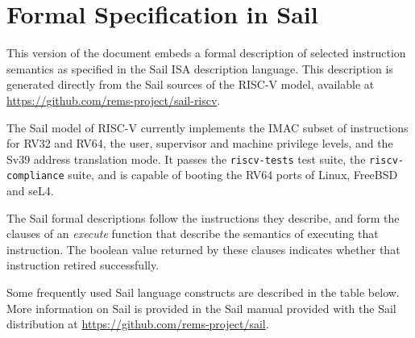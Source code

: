 \section{Formal Specification in Sail}
\label{sect:user-sail-model}

This version of the document embeds a formal description of selected
instruction semantics as specified in the Sail ISA description
language\cite{sail-site}.  This description is generated directly from
the Sail sources of the RISC-V model, available at
\url{https://github.com/rems-project/sail-riscv}.

The Sail model of RISC-V currently implements the IMAC subset of
instructions for RV32 and RV64, the user, supervisor and machine
privilege levels, and the Sv39 address translation mode.  It passes
the \texttt{riscv-tests} test suite, the \texttt{riscv-compliance}
suite, and is capable of booting the RV64 ports of Linux, FreeBSD and
seL4.

The Sail formal descriptions follow the instructions they describe, and
form the clauses of an \textit{execute} function that describe the
semantics of executing that instruction.  The boolean value returned
by these clauses indicates whether that instruction retired
successfully.

Some frequently used Sail language constructs are described in the
table below.  More information on Sail is provided in the Sail manual
provided with the Sail distribution at
\url{https://github.com/rems-project/sail}.

